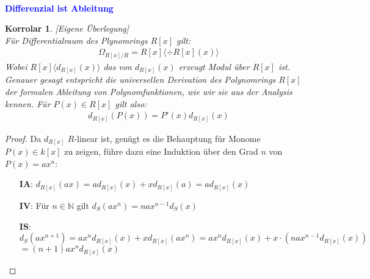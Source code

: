 \documentclass[10pt,a4paper]{report}
\newcounter{Aussage}[chapter]
\newtheorem{korrolar}[Aussage]{Korrolar}
\newcommand{\divR}[2]{\Omega_{#1/#2}}
\newcommand{\divf}[1]{d_{#1}}
\begin{document}
\ \\
\textcolor{blue}{\textbf{Differenzial ist Ableitung}}
\begin{korrolar}\label{Derivation ist Ableitung}\textit{[Eigene Überlegung]}\\
Für Differentialraum des Plynomrings $R[x]$ gilt:
\begin{gather*}
\divR{R[x]}{R} = R[x]\langle \div{R[x]}(x) \rangle
\end{gather*}
Wobei $R[x] \langle \divf{R[x]}(x)\rangle$ das von $\divf{R[x]}(x)$ erzeugt Modul über $R[x]$ ist.\\
Genauer gesagt entspricht die universellen Derivation des Polynomrings $R[x]$ der formalen Ableitung von Polynomfunktionen, wie wir sie aus der Analysis kennen. Für $P(x) \in R[x]$ gilt also:
\begin{gather*}
\divf{R[x]}(P(x)) = P'(x)\divf{R[x]}(x)
\end{gather*}
\end{korrolar}
\begin{proof}
Da $\divf{R[x]}$ $R$-linear ist, genügt es die Behauptung für Monome $P(x) \in k[x]$ zu zeigen, führe dazu eine Induktion über den Grad $n$ von $P(x) = ax^n$:
\begin{spacing}{1.5}
\begin{itemize}
\item[\textbf{IA}:] $\divf{R[x]}(ax) = a\divf{R[x]}(x) + x\divf{R[x]}(a) = a\divf{R[x]}(x)$
\item[\textbf{IV}:] Für $n \in \mathbb{N}$ gilt $\divf{S}(ax^n) = na x^{n-1}\divf{S}(x)$
\item[\textbf{IS}:] 
$\divf{S}(ax^{n+1}) = ax^n\divf{R[x]}(x) + x\divf{R[x]}(ax^n) = ax^n\divf{R[x]}(x) + x \cdot (na x^{n-1}\divf{R[x]}(x))$\\
$ = (n+1)ax^n\divf{R[x]}(x)$
\end{itemize}
\end{spacing}
\end{proof}
\end{document}
